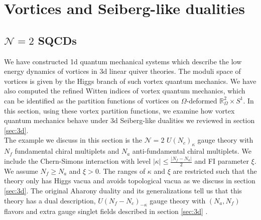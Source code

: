 \documentclass[a4paper,11pt]{article}
\begin{document}
\section{Vortices and Seiberg-like dualities}
\label{sec:SD}
\subsection{$\mathcal N = 2$ SQCDs}
\label{sec:Aharony}

We have constructed 1d quantum mechanical systems which describe the low energy dynamics of vortices in 3d linear quiver theories. The moduli space of vortices is given by the Higgs branch of such vortex quantum mechanics. We have also computed the refined Witten indices of vortex quantum mechanics, which can be identified as the partition functions of vortices on $\Omega$-deformed $\mathbb R^2_\Omega \times S^1$. In this section, using these vortex partition functions, we examine how vortex quantum mechanics behave under 3d Seiberg-like dualities we reviewed in section \ref{sec:3d}.
\\


The example we discuss in this section is the $\mathcal N = 2$ $U(N_c)_\kappa$ gauge theory with $N_f$ fundamental chiral multiplets and $N_a$ anti-fundamental chiral multiplets. We include the Chern-Simons interaction with level $|\kappa| \leq \frac{|N_f-N_a|}{2}$ and FI parameter $\xi$. We assume $N_f \geq N_a$ and $\xi > 0$. The ranges of $\kappa$ and $\xi$ are restricted such that the theory only has Higgs vacua and avoids topological vacua as we discuss in section \ref{sec:3d}. The original Aharony duality and its generalizations tell us that this theory has a dual description, $U(N_f-N_c)_{-\kappa}$ gauge theory with $(N_a,N_f)$ flavors and extra gauge singlet fields described in section \ref{sec:3d} \cite{Aharony:1997gp,Benini:2011mf}.
\end{document}
